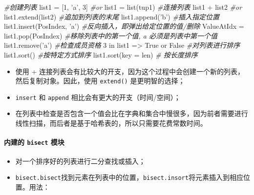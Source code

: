 \documentclass[]{ctexart}
\newenvironment{Shaded}{}{}
\newcommand{\DecValTok}[1]{\textcolor[rgb]{0.25,0.63,0.44}{{#1}}}
\newcommand{\StringTok}[1]{\textcolor[rgb]{0.25,0.44,0.63}{{#1}}}
\newcommand{\CommentTok}[1]{\textcolor[rgb]{0.38,0.63,0.69}{\textit{{#1}}}}
\newcommand{\VariableTok}[1]{\textcolor[rgb]{0.10,0.09,0.49}{{#1}}}
\newcommand{\OperatorTok}[1]{\textcolor[rgb]{0.40,0.40,0.40}{{#1}}}
\newcommand{\BuiltInTok}[1]{{#1}}
\newcommand{\NormalTok}[1]{{#1}}
\let\oldparagraph\paragraph
\renewcommand{\paragraph}[1]{\oldparagraph{#1}\mbox{}}
\begin{document}
\begin{Shaded}
\begin{Highlighting}[]
\CommentTok{#创建列表}
\NormalTok{list1 }\OperatorTok{=} \NormalTok{[}\DecValTok{1}\NormalTok{, }\StringTok{'a'}\NormalTok{, }\DecValTok{3}\NormalTok{]}
\CommentTok{#or}
\NormalTok{list1 }\OperatorTok{=} \BuiltInTok{list}\NormalTok{(tup1)}
\CommentTok{#连接列表}
\NormalTok{list1 }\OperatorTok{+} \NormalTok{list2 }
\CommentTok{#or}
\NormalTok{list1.extend(list2)}
\CommentTok{#追加到列表的末尾}
\NormalTok{list1.append(}\StringTok{'b'}\NormalTok{)}
\CommentTok{#插入指定位置}
\NormalTok{list1.insert(PosIndex, }\StringTok{'a'}\NormalTok{)}
\CommentTok{#反向插入，即弹出给定位置的值/删除}
\NormalTok{ValueAtIdx }\OperatorTok{=} \NormalTok{list1.pop(PosIndex)}
\CommentTok{#移除列表中的第一个值, a 必须是列表中第一个值}
\NormalTok{list1.remove(}\StringTok{'a'}\NormalTok{)}
\CommentTok{#检查成员资格}
\DecValTok{3} \OperatorTok{in} \NormalTok{list1 }\OperatorTok{=>} \VariableTok{True} \OperatorTok{or} \VariableTok{False}
\CommentTok{#对列表进行排序}
\NormalTok{list1.sort()}
\CommentTok{#按特定方式排序}
\NormalTok{list1.sort(key }\OperatorTok{=} \BuiltInTok{len}\NormalTok{) }\CommentTok{# 按长度排序}
\end{Highlighting}
\end{Shaded}

\begin{itemize}
\item
  使用 +
  连接列表会有比较大的开支，因为这个过程中会创建一个新的列表，然后复制对象。因此，使用
  \texttt{extend()} 是更明智的选择；
\item
  \texttt{insert} 和 \texttt{append} 相比会有更大的开支（时间/空间）；
\item
  在列表中检查是否包含一个值会比在字典和集合中慢很多，因为前者需要进行线性扫描，而后者是基于哈希表的，所以只需要花费常数时间。
\end{itemize}

\paragraph{\texorpdfstring{内建的 \texttt{bisect}
模块}{内建的 bisect 模块}}\label{header-n147}

\begin{itemize}
\item
  对一个排序好的列表进行二分查找或插入；
\item
  \texttt{bisect.bisect}找到元素在列表中的位置，\texttt{bisect.insort}将元素插入到相应位置。用法：
\end{itemize}
\end{document}
